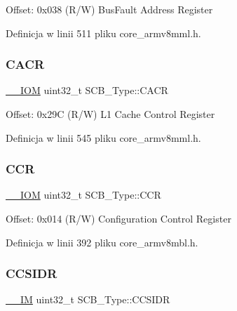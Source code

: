 Offset\+: 0x038 (R/W) Bus\+Fault Address Register 

Definicja w linii 511 pliku core\+\_\+armv8mml.\+h.

\mbox{\label{struct_s_c_b___type_a51f9bd107a4e1d46ba647384e5c825b5}} 
\subsubsection{\texorpdfstring{C\+A\+CR}{CACR}}
{\footnotesize\ttfamily \hyperlink{core__sc300_8h_ab6caba5853a60a17e8e04499b52bf691}{\+\_\+\+\_\+\+I\+OM} uint32\+\_\+t S\+C\+B\+\_\+\+Type\+::\+C\+A\+CR}

Offset\+: 0x29C (R/W) L1 Cache Control Register 

Definicja w linii 545 pliku core\+\_\+armv8mml.\+h.

\mbox{\label{struct_s_c_b___type_a2d6653b0b70faac936046a02809b577f}} 
\subsubsection{\texorpdfstring{C\+CR}{CCR}}
{\footnotesize\ttfamily \hyperlink{core__sc300_8h_ab6caba5853a60a17e8e04499b52bf691}{\+\_\+\+\_\+\+I\+OM} uint32\+\_\+t S\+C\+B\+\_\+\+Type\+::\+C\+CR}

Offset\+: 0x014 (R/W) Configuration Control Register 

Definicja w linii 392 pliku core\+\_\+armv8mbl.\+h.

\mbox{\label{struct_s_c_b___type_afd063c9297a1a3b67e6d1d5e179e6a0e}} 
\subsubsection{\texorpdfstring{C\+C\+S\+I\+DR}{CCSIDR}}
{\footnotesize\ttfamily \hyperlink{core__sc300_8h_a4cc1649793116d7c2d8afce7a4ffce43}{\+\_\+\+\_\+\+IM} uint32\+\_\+t S\+C\+B\+\_\+\+Type\+::\+C\+C\+S\+I\+DR}

